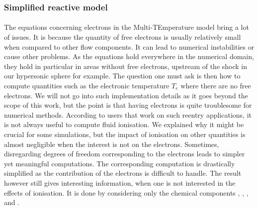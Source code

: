       \subsubsection{Simplified reactive model}

        \paragraph{}
        The equations concerning electrons in the Multi-TEmperature model bring a lot of issues.
        It is because the quantity of free electrons is usually relatively small when compared to other flow components.
        It can lead to numerical instabilities or cause other problems.
        As the equations hold everywhere in the numerical domain, they hold in particular in areas without free electrons, upstream of the shock in our hypersonic sphere for example.
        The question one must ask is then how to compute quantities such as the electronic temperature $T_e$ where there are no free electrons.
        We will not go into such implementation details as it goes beyond the scope of this work, but the point is that having electrons is quite troublesome for numerical methods.
        According to users that work on such reentry applications, it is not always useful to compute fluid ionisation.
        We explained why it might be crucial for some simulations, but the impact of ionisation on other quantities is almost negligible when the interest is not on the electrons.
        Sometimes, disregarding degrees of freedom corresponding to the electrons leads to simpler yet meaningful computations.
        The corresponding computation is drastically simplified as the contribution of the electrons is difficult to handle.
        The result however still gives interesting information, when one is not interested in the effects of ionisation.
        It is done by considering only the chemical components , , ,  and .

